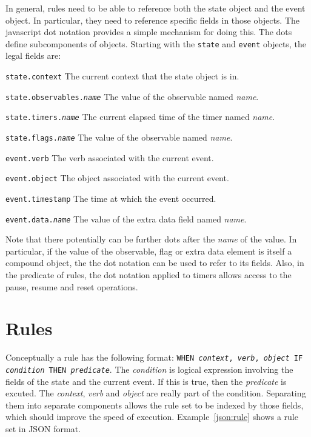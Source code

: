 \documentclass{article}
\begin{document}
  In general, rules need to be able to reference both the state object
  and the event object.  In particular, they need to reference
  specific fields in those objects.  The javascript dot notation
  provides a simple mechanism for doing this.  The dots define
  subcomponents of objects.  Starting with the \texttt{state} and
  \texttt{event} objects, the legal fields are:
  \begin{describe}
    \item[\texttt{state.context}]{The current context that the state
      object is in.}
    \item[\texttt{state.observables.\textit{name}}]{The value of the
      observable named \textit{name}.}
    \item[\texttt{state.timers.\textit{name}}]{The current elapsed
      time of the timer named \textit{name}.}
    \item[\texttt{state.flags.\textit{name}}]{The value of the
      observable named \textit{name}.}
    \item[\texttt{event.verb}]{The verb associated with the current event.}
    \item[\texttt{event.object}]{The object associated with the current event.}
    \item[\texttt{event.timestamp}]{The time at which the event
      occurred.}
    \item[\texttt{event.data.\textit{name}}]{The value of the
      extra data field named \textit{name}.}
  \end{describe}

  Note that there potentially can be further dots after the
  \textit{name} of the value.  In particular, if the value of the
  observable, flag or extra data element is itself a compound object,
  the the dot notation can be used to refer to its fields.  Also, in
  the predicate of rules, the dot notation applied to timers allows
  access to the pause, resume and reset operations.

  \section{Rules}
  \label{sec:Rules}

  Conceptually a rule has the following format:  \texttt{WHEN
    \textit{context}, \textit{verb}, \textit{object} IF
    \textit{condition} THEN \textit{predicate}}.  The
  \textit{condition} is logical expression involving the fields of the
  state and the current event.  If this is true, then the
  \textit{predicate} is excuted.  The \textit{context}, \textit{verb}
  and \textit{object} are really part of the condition.  Separating
  them into separate components allows the rule set to be indexed by
  those fields, which should improve the speed of execution.
  Example~\ref{json:rule} shows a rule set in JSON format.
\end{document}

